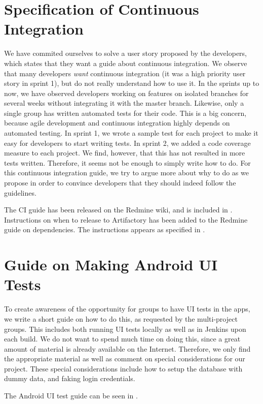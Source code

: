 \section{Specification of Continuous Integration}
We have commited ourselves to solve a user story proposed by the developers, which states that they want a guide about continuous integration. We observe that many developers \emph{want} continuous integration (it was a high priority user story in sprint 1), but do not really understand how to use it. In the sprints up to now, we have observed developers working on features on isolated branches for several weeks without integrating it with the master branch. Likewise, only a single group has written automated tests for their code. This is a big concern, because agile development and continuous integration highly depends on automated testing. In sprint 1, we wrote a sample test for each project to make it easy for developers to start writing tests. In sprint 2, we added a code coverage measure to each project. We find, however, that this has not resulted in more tests written. Therefore, it seems not be enough to simply write how to do. For this continuous integration guide, we try to argue more about why to do as we propose in order to convince developers that they should indeed follow the guidelines.

The CI guide has been released on the Redmine wiki, and is included in . Instructions on when to release to Artifactory has been added to the Redmine guide on dependencies. The instructions appears as specified in .

\section{Guide on Making Android UI Tests}
To create awareness of the opportunity for groups to have UI tests in the apps, we write a short guide on how to do this, as requested by the multi-project groups. This includes both running UI tests locally as well as in Jenkins upon each build. We do not want to spend much time on doing this, since a great amount of material is already available on the Internet. Therefore, we only find the appropriate material as well as comment on special considerations for our project. These special considerations include how to setup the database with dummy data, and faking login credentials.

The Android UI test guide can be seen in .